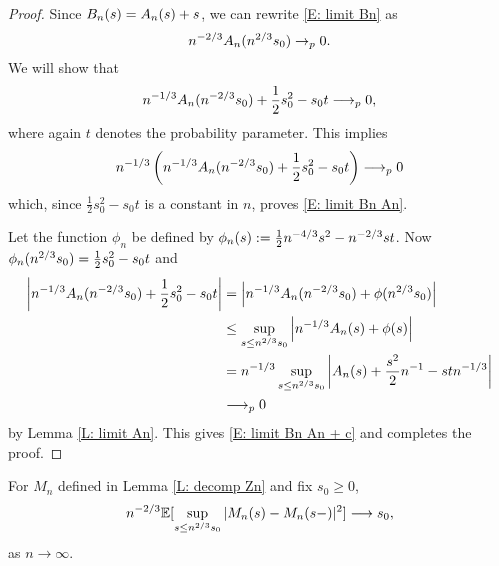 \begin{proof} \label{P: limit Bn}
	Since $B_n(s) = A_n(s) + s$, we can rewrite \eqref{E: limit Bn} as
	\begin{equation} \label{E: limit Bn An}
	n^{-2 / 3} A_n(n^{2 / 3}s_0) \rightarrow_p 0.
	\end{equation}
	We will show that
	\begin{equation} \label{E: limit Bn An + c}
	n^{-1 / 3} A_n(n^{-2 / 3}s_0) + \frac{1}{2}s_0^2 - s_0t \longrightarrow_p 0,
	\end{equation}
	where again $t$ denotes the probability parameter. 
	This implies
	\begin{equation*}
	n^{-1 / 3} \left( n^{-1 / 3} A_n(n^{-2 / 3}s_0) + \frac{1}{2}s_0^2 - s_0t \right) \longrightarrow_p 0
	\end{equation*}
	which, since $\frac{1}{2}s_0^2 - s_0t$ is a constant in $n$, proves \eqref{E: limit Bn An}.
	
	Let the function $\phi_n$ be defined by $\phi_n(s) := \frac{1}{2}n^{-4 / 3}s^2 - n^{-2 / 3}st$.	
	Now $\phi_n(n^{2 / 3}s_0) = \frac{1}{2}s_0^2 - s_0t$ and
	\begin{align*}
	\left| n^{-1 / 3} A_n(n^{-2 / 3}s_0) + \frac{1}{2}s_0^2 - s_0t \right| 
	&= \left| n^{-1 / 3} A_n(n^{-2 / 3}s_0) + \phi(n^{2 / 3}s_0) \right| \\
	&\leq \sup_{s \leq n^{2 / 3} s_0 } \left| n^{-1 / 3} A_n(s) + \phi(s) \right| \\
	&= n^{-1 / 3} \sup_{s \leq n^{2 / 3} s_0 } \left| A_n(s) + \frac{s^2}{2}n^{-1} - stn^{-1 / 3} \right| \\
	&\longrightarrow_p 0
	\end{align*}
	by Lemma \ref{L: limit An}. This gives \eqref{E: limit Bn An + c} and completes the proof.
\end{proof}


\begin{lemma} \label{L: limit Mn}
	For $M_n$ defined in Lemma \ref{L: decomp Zn} and fix $s_0 \geq 0$,
	\begin{equation} \label{E: limit Mn}
	n^{-2 / 3} \mathbb{E}[\sup_{s \leq n^{2 / 3} s_0 } |M_n(s) - M_n(s-)|^2] \longrightarrow s_0,
	\end{equation}
	as $n\longrightarrow \infty$.
\end{lemma}

